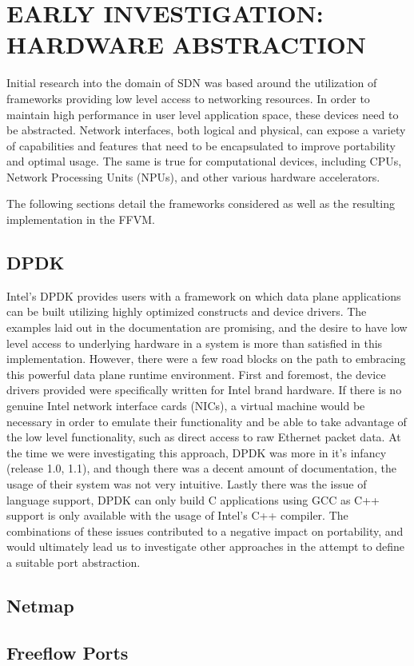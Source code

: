 \chapter{EARLY INVESTIGATION: HARDWARE ABSTRACTION}
\label{hardware}
Initial research into the domain of SDN was based around the utilization
of frameworks providing low level access to networking resources. In order
to maintain high performance in user level application space, these devices
need to be abstracted. Network interfaces, both logical and physical, can
expose a variety of capabilities and features that need to be encapsulated
to improve portability and optimal usage. The same is true for computational
devices, including CPUs, Network Processing Units (NPUs), and other various
hardware accelerators.

The following sections detail the frameworks considered as well as the
resulting implementation in the FFVM.

\section{DPDK}
\label{hardware:dpdk}
Intel's DPDK provides users with a framework on which data plane
applications can be built utilizing highly optimized constructs and
device drivers. The examples laid out in the documentation are
promising, and the desire to have low level access to underlying
hardware in a system is more than satisfied in this implementation.
However, there were a few road blocks on the path to embracing this
powerful data plane runtime environment. First and foremost, the
device drivers provided were specifically written for Intel brand
hardware. If there is no genuine Intel network interface cards
(NICs), a virtual machine would be necessary in order to emulate
their functionality and be able to take advantage of the low level
functionality, such as direct access to raw Ethernet packet data.
At the time we were investigating this approach, DPDK was more in
it's infancy (release 1.0, 1.1), and though there was a decent amount
of documentation, the usage of their system was not very intuitive.
Lastly there was the issue of language support, DPDK can only build
C applications using GCC as C++ support is only available with the
usage of Intel's C++ compiler. The combinations of these issues
contributed to a negative impact on portability, and would ultimately
lead us to investigate other approaches in the attempt to define
a suitable port abstraction.

\section{Netmap}
\label{hardware:netmap}

\section{Freeflow Ports}
\label{hardware:ffports}
